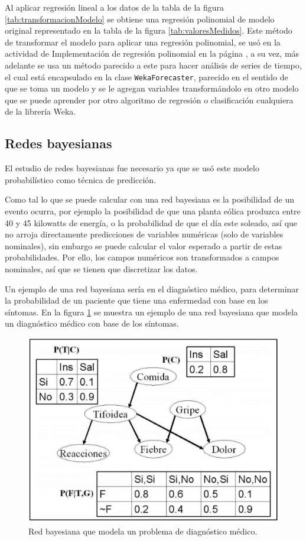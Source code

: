 Al aplicar regresión lineal a los datos de la tabla de la figura \ref{tab:transformacionModelo} se obtiene una regresión
polinomial de modelo original representado en la tabla de la figura \ref{tab:valoresMedidos}. 
Este método de transformar el modelo para aplicar una regresión polinomial, se usó en la actividad de Implementación de regresión polinomial en la página \pageref{subsec:implementacionRegresionPolinomial}, a su vez, más adelante se usa un método parecido a este para hacer análisis de series de tiempo, el cual está encapsulado en la clase \texttt{WekaForecaster}, parecido en el sentido de que se toma un modelo y se le agregan variables transformándolo en otro modelo que se puede aprender por otro algoritmo de regresión o clasificación cualquiera de la librería Weka.

\subsection{Redes bayesianas} \label{subsec:redesbayesianas}
El estudio de redes bayesianas fue necesario ya que se usó este modelo probabilístico como técnica de predicción.

Como tal lo que se puede calcular con una red bayesiana es la posibilidad de un evento ocurra,
por ejemplo la posibilidad de que una planta eólica produzca entre 40 y 45 kilowatts de energía, o la probabilidad de que el día este soleado, así que no arroja directamente predicciones de variables numéricas (solo de variables nominales), sin embargo se puede calcular el valor esperado a partir de estas probabilidades. Por ello, los campos numéricos son transformados a campos nominales, así que se tienen que discretizar los datos.

Un ejemplo de una red bayesiana sería en el diagnóstico médico, para determinar la probabilidad de un paciente que tiene una enfermedad con base en los síntomas. En la figura \ref{fig:redBayesianaDiagnostico} se muestra un ejemplo de una red bayesiana que modela un diagnóstico médico con base de los síntomas.

\begin{figure}[h]
	\centering
	\includegraphics[width=13cm]{img/redBayesianaDiagnostico.png}
	\caption{Red bayesiana que modela un problema de diagnóstico médico.}
	\label{fig:redBayesianaDiagnostico}
\end{figure}

